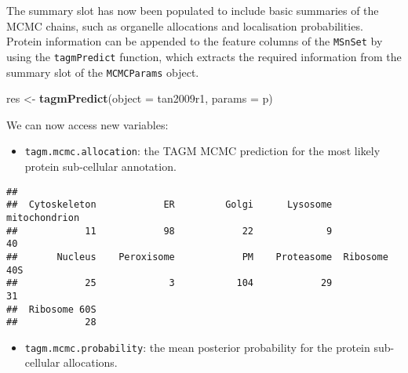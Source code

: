 \documentclass[9pt,a4paper,]{extarticle}
\newenvironment{Shaded}{\begin{snugshade}}{\end{snugshade}}
\newcommand{\DataTypeTok}[1]{\textcolor[rgb]{0.13,0.29,0.53}{#1}}
\newcommand{\KeywordTok}[1]{\textcolor[rgb]{0.13,0.29,0.53}{\textbf{#1}}}
\newcommand{\NormalTok}[1]{#1}
\newcommand{\OperatorTok}[1]{\textcolor[rgb]{0.81,0.36,0.00}{\textbf{#1}}}
\newcommand{\StringTok}[1]{\textcolor[rgb]{0.31,0.60,0.02}{#1}}
\begin{document}
The summary slot has now been populated to include basic summaries of
the MCMC chains, such as organelle allocations and localisation
probabilities. Protein information can be appended to the feature
columns of the \texttt{MSnSet} by using the \texttt{tagmPredict} function, which
extracts the required information from the summary slot of the
\texttt{MCMCParams} object.

\begin{Shaded}
\begin{Highlighting}[]
\NormalTok{res <-}\StringTok{ }\KeywordTok{tagmPredict}\NormalTok{(}\DataTypeTok{object =}\NormalTok{ tan2009r1, }\DataTypeTok{params =}\NormalTok{ p)}
\end{Highlighting}
\end{Shaded}

We can now access new variables:

\begin{itemize}
\item
  \texttt{tagm.mcmc.allocation}: the TAGM MCMC prediction for the most likely
  protein sub-cellular annotation.
\end{itemize}

\begin{Shaded}
\end{Shaded}

\begin{verbatim}
## 
##  Cytoskeleton            ER         Golgi      Lysosome mitochondrion 
##            11            98            22             9            40 
##       Nucleus    Peroxisome            PM    Proteasome  Ribosome 40S 
##            25             3           104            29            31 
##  Ribosome 60S 
##            28
\end{verbatim}

\begin{itemize}
\item
  \texttt{tagm.mcmc.probability}: the mean posterior probability for the protein
  sub-cellular allocations.
\end{itemize}

\begin{Shaded}
\end{Shaded}
\end{document}
